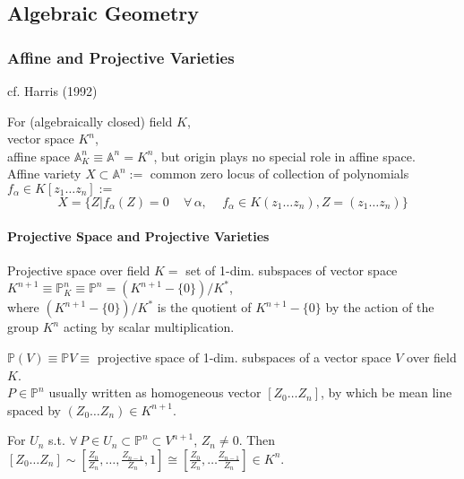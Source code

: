 \documentclass[10pt]{amsart}
\begin{document}
\begin{multicols*}{2}








\part{Algebraic Geometry}

\section{Affine and Projective Varieties}

cf. Harris (1992)\cite{Har1992}

For (algebraically closed) field $K$,  \\
vector space $K^n$,  \\
affine space $\mathbb{A}^n_K \equiv \mathbb{A}^n = K^n$, but origin plays no special role in affine space. \\
Affine variety $X \subset \mathbb{A}^n := $ common zero locus of collection of polynomials $f_{\alpha} \in K [z_1 \dots z_n] :=$ 
\[
X = \lbrace Z | f_{\alpha}(Z) = 0 \quad \, \forall \, \alpha , \quad \, f_{\alpha} \in K(z_1 \dots z_n), Z = (z_1 \dots z_n) \rbrace 
\]

\subsection{Projective Space and Projective Varieties} 

Projective space over field $K = $ set of 1-dim. subspaces of vector space $K^{n+1} \equiv \mathbb{P}^n_K \equiv \mathbb{P}^n = (K^{n+1} - \lbrace 0 \rbrace ) / K^*$, \\
where $(K^{n+1} - \lbrace 0 \rbrace ) / K^*$ is the quotient of $K^{n+1} - \lbrace 0 \rbrace$ by the action of the group $K^n$ acting by scalar multiplication. 

$\mathbb{P}(V) \equiv \mathbb{P}V \equiv $ projective space of 1-dim. subspaces of a vector space $V$ over field $K$. \\
$P \in \mathbb{P}^n$ usually written as homogeneous vector $[Z_0 \dots Z_n]$, by which be mean line spaced by $(Z_0 \dots Z_n) \in K^{n+1}$. 

For $U_n$ s.t. $\forall \, P \in U_n \subset \mathbb{P}^n \subset V^{n+1}$, $Z_n \neq 0$.  Then $[Z_0 \dots Z_n] \sim \left[ \frac{ Z_0}{ Z_n} , \dots , \frac{Z_{n-1}}{Z_n} , 1 \right] \cong \left[ \frac{Z_0}{Z_n} , \dots \frac{Z_{n-1}}{ Z_n } \right] \in K^n$.  


\end{multicols*}
\end{document}
